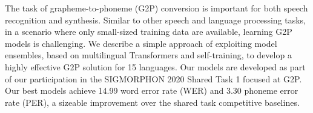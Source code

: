 The task of grapheme-to-phoneme (G2P) conversion is important for both speech recognition and synthesis. Similar to other speech and language processing tasks, in a scenario where only small-sized training data are available, learning G2P models is challenging. We describe a simple approach of exploiting model ensembles, based on multilingual Transformers and self-training, to develop a highly effective G2P solution for 15 languages. Our models are developed as part of our participation in the SIGMORPHON 2020 Shared Task 1 focused at G2P. Our best models achieve 14.99 word error rate (WER) and 3.30 phoneme error rate (PER), a sizeable improvement over the shared task competitive baselines.
